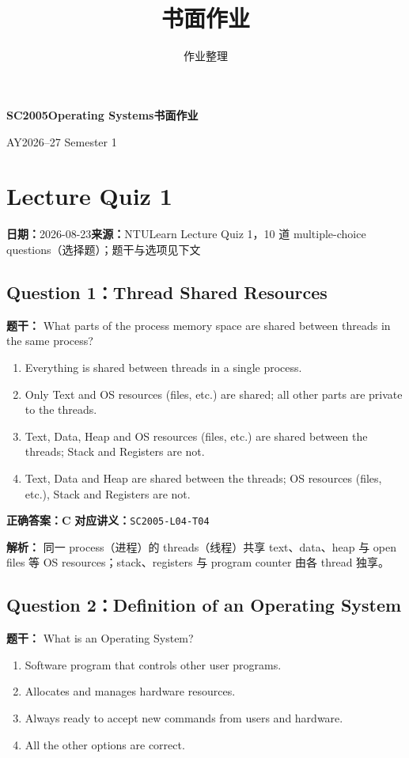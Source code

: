 \documentclass[11pt,a4paper,fontset=fandol]{ctexart}
\title{\textcolor{ntuRed}{\coursecode}\\[0.4em]\coursetitle\\[0.8em]\large 书面作业}
\author{作业整理}
\newcommand{\coursecode}{SC2005}
\newcommand{\coursetitle}{Operating Systems}
\newcommand{\academicyear}{AY2026--27 Semester 1}
\renewcommand{\exercisequestion}[2]{%
  \Needspace{5\baselineskip}%
  \subsection{#2}\label{exercise:#1}%
}
\renewcommand{\exercisemeta}[5]{%
  {\small\textbf{日期：}#2\quad\textbf{来源：}#3\par}%
}
\renewenvironment{checkedsolution}
  {\par\nopagebreak[4]\textbf{解析：}\ignorespaces}
  {\par}
\begin{document}
\begin{center}
  {\Large\bfseries\textcolor{ntuRed}{\coursecode}\quad\coursetitle\quad 书面作业\par}
  {\small\academicyear\par}
\end{center}

\section{Lecture Quiz 1}
\label{homework:SC2005-HW01}

\exercisemeta
  {SC2005-HW01}
  {2026-08-23}
  {NTULearn Lecture Quiz 1，10 道 multiple-choice questions（选择题）；题干与选项见下文}
  {已完成，并根据平台反馈逐题核对}
  {是（2026-08-23）}

\exercisequestion{SC2005-HW01-Q01}{Question 1：Thread Shared Resources}

\textbf{题干：} What parts of the process memory space are shared between threads in the same process?

\begin{enumerate}[label=\Alph*.,leftmargin=2.4em]
  \item Everything is shared between threads in a single process.
  \item Only Text and OS resources (files, etc.) are shared; all other parts are private to the threads.
  \item Text, Data, Heap and OS resources (files, etc.) are shared between the threads; Stack and Registers are not.
  \item Text, Data and Heap are shared between the threads; OS resources (files, etc.), Stack and Registers are not.
\end{enumerate}

\textbf{正确答案：C}\qquad
\textbf{对应讲义：}\texttt{SC2005-L04-T04}

\begin{checkedsolution}
同一 process（进程）的 threads（线程）共享 text、data、heap 与 open files 等 OS resources；stack、registers 与 program counter 由各 thread 独享。
\end{checkedsolution}

\exercisequestion{SC2005-HW01-Q02}{Question 2：Definition of an Operating System}

\textbf{题干：} What is an Operating System?

\begin{enumerate}[label=\Alph*.,leftmargin=2.4em]
  \item Software program that controls other user programs.
  \item Allocates and manages hardware resources.
  \item Always ready to accept new commands from users and hardware.
  \item All the other options are correct.
\end{enumerate}
\end{document}
